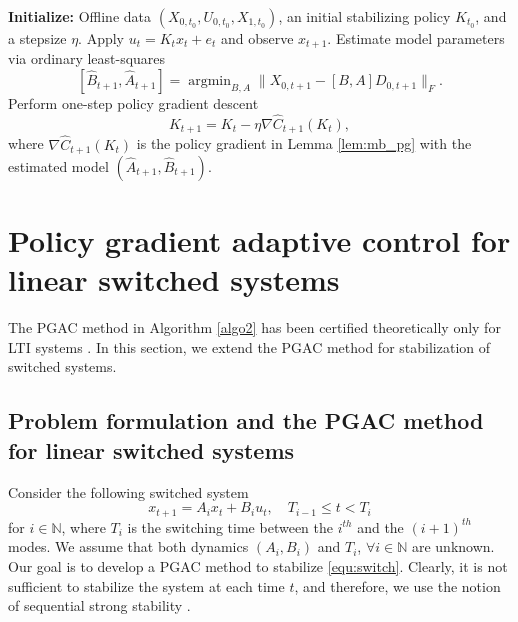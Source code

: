 \documentclass[letterpaper, 10 pt, conference]{ieeeconf}  %
\newtheorem{definition}{Definition}
\begin{document}
\begin{algorithm}
\caption{Policy gradient adaptive control for LIT systems}
\label{algo2}
\begin{algorithmic}[1]
\State \textbf{Initialize:} Offline data \((X_{0,t_0}, U_{0,t_0}, X_{1,t_0})\), an initial stabilizing policy \(K_{t_0}\), and a stepsize \(\eta\).
    \State Apply \(u_t = K_t x_t + e_t\) and observe \(x_{t+1}\).
    \State Estimate model parameters via ordinary least-squares
    \[
    [\hat{B}_{t+1}, \hat{A}_{t+1}] = \mathop{\arg\min}_{B, A} \| X_{0,t+1} - [B, A] D_{0,t+1} \|_F.
    \]
    \State Perform one-step policy gradient descent
    \[
    K_{t+1} = K_t - \eta \nabla \hat{C}_{t+1}(K_t),
    \]
    where \(\nabla \hat{C}_{t+1}(K_t)\) is the policy gradient in Lemma \ref{lem:mb_pg} with the estimated model \((\hat{A}_{t+1}, \hat{B}_{t+1})\).
\EndFor
\end{algorithmic}
\end{algorithm}

\section{Policy gradient adaptive control for linear switched systems}

The PGAC method in Algorithm \ref{algo2} has been certified theoretically only for LTI systems \cite{zhao2024data,zhao2025policy}.
In this section, we extend the PGAC method for stabilization of switched systems.

\subsection{Problem formulation and the PGAC method for linear switched systems}
Consider the following switched system
\begin{equation}\label{equ:switch}
x_{t+1} = A_i x_t + B_i u_t, \quad T_{i-1} \leq t < T_{i}
\end{equation} 
for $i \in \mathbb{N}$, where $T_i$ is the switching time between the $i^{th}$ and the $(i+1)^{th}$ modes. We assume that both dynamics $(A_i, B_i)$ and $T_i$, $\forall i\in \mathbb{N}$ are unknown. Our goal is to develop a PGAC method to stabilize \eqref{equ:switch}. Clearly, it is not sufficient to stabilize the system at each time $t$, and therefore, we use the notion of sequential strong stability \cite{cohen2018online}. 

\end{document}

